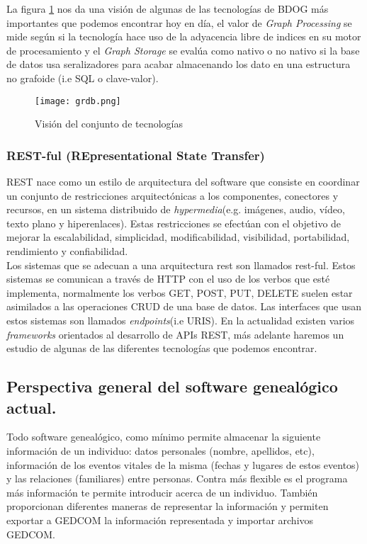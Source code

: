 La figura \ref{fig:grdb} nos da una visión de algunas de las tecnologías de BDOG más importantes que podemos encontrar hoy en día, el valor de \textit{Graph Processing} se mide según si la tecnología hace uso de la adyacencia libre de indices en su motor de procesamiento y el \textit{Graph Storage} se evalúa como nativo o no nativo si la base de datos usa seralizadores para acabar almacenando los dato en una estructura no grafoide (i.e SQL o clave-valor).

\begin{figure}[ht!]
\center
\texttt{[image: grdb.png]}
\caption{Visión del conjunto de tecnologías}
\label{fig:grdb}
\end{figure}
\newpage

\subsubsection{REST-ful (REpresentational State Transfer)}
REST nace como un estilo de arquitectura del software que consiste en coordinar un conjunto de restricciones arquitectónicas  a los componentes, conectores y recursos, en un sistema distribuido de \textit{hypermedia}(e.g. imágenes, audio, vídeo, texto plano y hiperenlaces). Estas restricciones se efectúan con el objetivo de mejorar la escalabilidad, simplicidad, modificabilidad, visibilidad, portabilidad, rendimiento y confiabilidad.\\
Los sistemas que se adecuan a una arquitectura rest son llamados rest-ful. Estos sistemas se comunican a través de HTTP con el uso de los verbos que esté implementa, normalmente los verbos GET, POST, PUT, DELETE suelen estar asimilados a las operaciones CRUD de una base de datos.
Las interfaces que usan estos sistemas son llamados \textit{endpoints}(i.e URIS).
En la actualidad existen varios \textit{frameworks} orientados al desarrollo de APIs REST, más adelante haremos un estudio de algunas de las diferentes tecnologías que podemos encontrar.

\subsection{Perspectiva general del software genealógico actual.}

Todo software genealógico, como mínimo permite almacenar la siguiente información de un individuo: datos personales (nombre, apellidos, etc), información de los eventos vitales de la misma (fechas y lugares de estos eventos) y las relaciones (familiares) entre personas.  Contra más flexible es el programa más información te permite introducir acerca de un individuo. También proporcionan diferentes maneras de representar la información y permiten exportar a GEDCOM la información representada y importar archivos GEDCOM.

